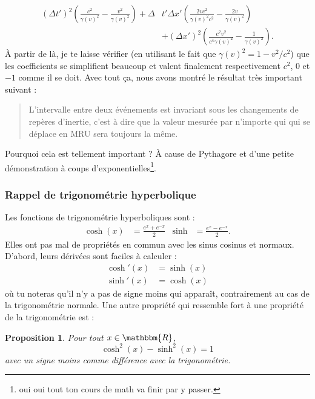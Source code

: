 \documentclass[a4paper,12pt]{book}
\newcommand{\eR}{\mathbbm{R}}
\newcounter{numtho}
\theoremstyle{mes_exemples}	\newtheorem{exemple}[numtho]{Exemple}
\theoremstyle{mes_tho}
\newtheorem{proposition}[numtho]{Proposition}
\begin{document}
\[ 
\begin{split}
  (\Delta t')^2\left( \frac{ c^2 }{ \gamma(v)^2 }-\frac{ v^2 }{ \gamma(v)^2 } \right)+\Delta &t'\Delta x'\left( \frac{ 2vc^2 }{ \gamma(v)^2c^2 }-\frac{ 2v }{ \gamma(v)^2 } \right)\\
	&+(\Delta x')^2\left( \frac{ c^2 v^2 }{ c^4\gamma(v)^2 }-\frac{1}{ \gamma(v)^2 } \right).
\end{split}
\]
À partir de là, je te laisse vérifier (en utilisant le fait que $\gamma(v)^2=1-v^2/c^2$) que les coefficients se simplifient beaucoup et valent finalement respectivement $c^2$, $0$ et $-1$ comme il se doit. Avec tout ça, nous avons montré le résultat très important suivant : 
\begin{quote}
L'intervalle entre deux événements est invariant sous les changements de repères d'inertie, c'est à dire que la valeur mesurée par n'importe qui qui se déplace en MRU sera toujours la même.
\end{quote}
Pourquoi cela est tellement important ? À cause de Pythagore et d'une petite démonstration à coups d'exponentielles\footnote{oui oui tout ton cours de math va finir par y passer.}.

\subsubsection{Rappel de trigonométrie hyperbolique}

Les fonctions de trigonométrie hyperboliques sont :
\begin{align}
\cosh(x)&=\frac{  e^{x}+ e^{-x} }{ 2 }&\sinh&=\frac{  e^{x}- e^{-x} }{ 2 }.
\end{align}
Elles ont pas mal de propriétés en commun avec les sinus cosinus et normaux. D'abord, leurs dérivées sont faciles à calculer :
\[ 
\begin{split}
\cosh'(x)&=\sinh(x)\\
\sinh'(x)&=\cosh(x)
\end{split}  
\]
où tu noteras qu'il n'y a pas de signe moins qui apparaît, contrairement au cas de la trigonométrie normale. Une autre propriété qui ressemble fort à une propriété de la trigonométrie est :

\begin{proposition}
Pour tout $x\in\eR$,
\begin{equation}
	\cosh^2(x)-\sinh^2(x)=1
\end{equation}
avec un signe moins comme différence avec la trigonométrie.
\end{proposition}
\end{document}
